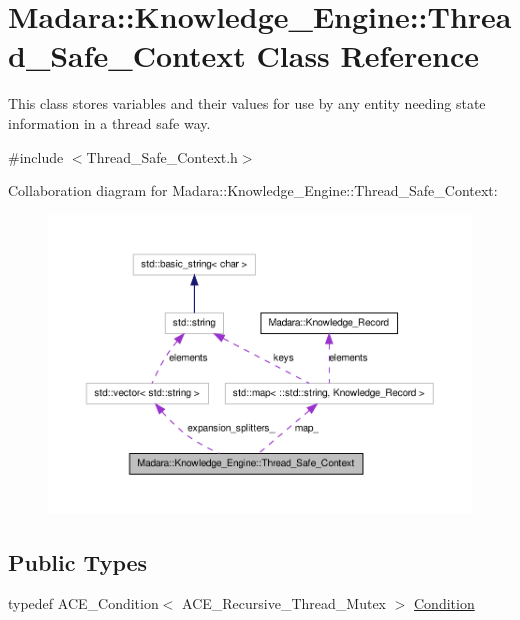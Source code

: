\hypertarget{classMadara_1_1Knowledge__Engine_1_1Thread__Safe__Context}{
\section{Madara::Knowledge\_\-Engine::Thread\_\-Safe\_\-Context Class Reference}
\label{d4/da3/classMadara_1_1Knowledge__Engine_1_1Thread__Safe__Context}
}


This class stores variables and their values for use by any entity needing state information in a thread safe way.  




{\ttfamily \#include $<$Thread\_\-Safe\_\-Context.h$>$}



Collaboration diagram for Madara::Knowledge\_\-Engine::Thread\_\-Safe\_\-Context:
\nopagebreak
\begin{figure}[H]
\begin{center}
\leavevmode
\includegraphics[width=400pt]{d9/d92/classMadara_1_1Knowledge__Engine_1_1Thread__Safe__Context__coll__graph}
\end{center}
\end{figure}
\subsection*{Public Types}
\begin{DoxyCompactItemize}
\item 
typedef ACE\_\-Condition$<$ ACE\_\-Recursive\_\-Thread\_\-Mutex $>$ \hyperlink{classMadara_1_1Knowledge__Engine_1_1Thread__Safe__Context_adad1b4f13e2506ea29d19c6ae0703f8e}{Condition}
\end{DoxyCompactItemize}
